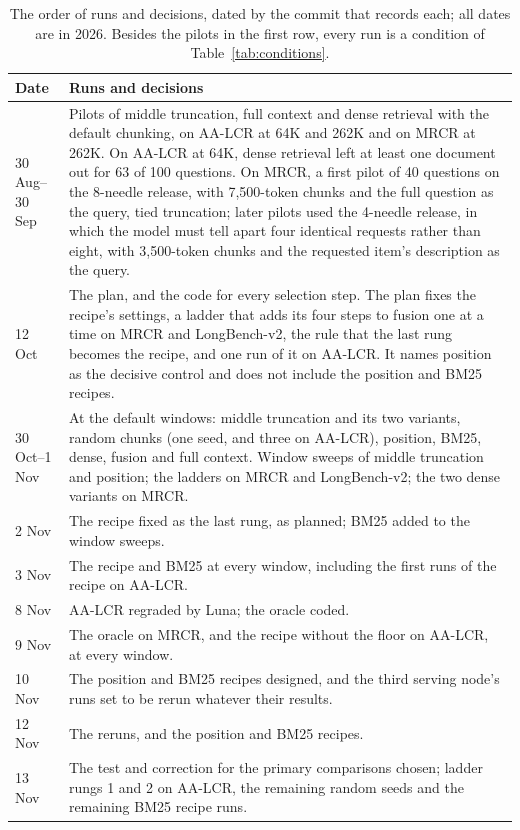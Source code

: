 \documentclass[letterpaper]{article} %
\begin{document}
\begin{table}[t]
\centering
\small
\begin{tabular}{lp{}}
\toprule
Date & Runs and decisions \\
\midrule
30 Aug--30 Sep & Pilots of middle truncation, full context and dense retrieval with the default chunking, on AA-LCR at 64K and 262K and on MRCR at 262K. On AA-LCR at 64K, dense retrieval left at least one document out for 63 of 100 questions. On MRCR, a first pilot of 40 questions on the 8-needle release, with 7,500-token chunks and the full question as the query, tied truncation; later pilots used the 4-needle release, in which the model must tell apart four identical requests rather than eight, with 3,500-token chunks and the requested item's description as the query. \\
12 Oct & The plan, and the code for every selection step. The plan fixes the recipe's settings, a ladder that adds its four steps to fusion one at a time on MRCR and LongBench-v2, the rule that the last rung becomes the recipe, and one run of it on AA-LCR. It names position as the decisive control and does not include the position and BM25 recipes. \\
30 Oct--1 Nov & At the default windows: middle truncation and its two variants, random chunks (one seed, and three on AA-LCR), position, BM25, dense, fusion and full context. Window sweeps of middle truncation and position; the ladders on MRCR and LongBench-v2; the two dense variants on MRCR. \\
2 Nov & The recipe fixed as the last rung, as planned; BM25 added to the window sweeps. \\
3 Nov & The recipe and BM25 at every window, including the first runs of the recipe on AA-LCR. \\
8 Nov & AA-LCR regraded by Luna; the oracle coded. \\
9 Nov & The oracle on MRCR, and the recipe without the floor on AA-LCR, at every window. \\
10 Nov & The position and BM25 recipes designed, and the third serving node's runs set to be rerun whatever their results. \\
12 Nov & The reruns, and the position and BM25 recipes. \\
13 Nov & The test and correction for the primary comparisons chosen; ladder rungs 1 and 2 on AA-LCR, the remaining random seeds and the remaining BM25 recipe runs. \\
\bottomrule
\end{tabular}
\caption{The order of runs and decisions, dated by the commit that records each; all dates are in 2026. Besides the pilots in the first row, every run is a condition of Table~\ref{tab:conditions}.}
\label{tab:log}
\end{table}
\end{document}
